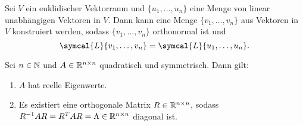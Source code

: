 \begin{repitition}\label{gram}
    Sei \(V\) ein euklidischer Vektorraum und \(\{u_1,\ldots,u_n\}\) eine Menge von linear unabhängigen Vektoren in \(V\). 
    Dann kann eine Menge \(\{v_1,\ldots,v_n\}\) aus Vektoren in \(V\)  konstruiert werden, sodass \(\{v_1,\ldots,v_n\}\) orthonormal ist und 
    \begin{equation*}
        \symcal{L}\{v_1,\ldots,v_n\} = \symcal{L}\{u_1,\ldots,u_n\}.
    \end{equation*}
\end{repitition}
\begin{theorem}[Spektralsatz]\label{spec}
    Sei \(n \in \mathbb{N}\) und \(A \in \mathbb{R}^{n \times n} \) quadratisch und symmetrisch. 
    Dann gilt:
    \begin{enumerate}[label= (\roman*)]
        \item \(A\) hat reelle Eigenwerte.\label{spec1}
        \item Es existiert eine orthogonale Matrix \(R \in \mathbb{R}^{n \times n}\), sodass \(R^{-1}AR = R^{T}AR = \Lambda \in \mathbb{R}^{n \times n}\) diagonal ist.\label{spec2}
    \end{enumerate}
\end{theorem}

